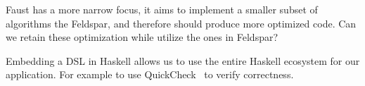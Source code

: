 \documentclass{scrartcl}
\begin{document}
Faust has a more narrow focus, it aims to implement a smaller subset of
algorithms the Feldspar, and therefore should produce more optimized code. Can
we retain these optimization while utilize the ones in Feldspar?

Embedding a DSL in Haskell allows us to use the entire Haskell ecosystem for
our application. For example to use QuickCheck~\cite{claessen_quickcheck_2000}
to verify correctness.




\end{document}
